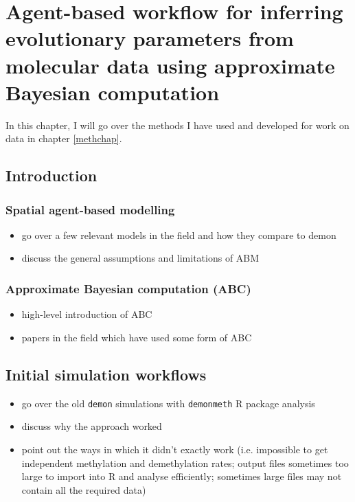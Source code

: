\chapter{Agent-based workflow for inferring evolutionary parameters from molecular data using approximate Bayesian computation}\label{demonchap}
In this chapter, I will go over the methods I have used and developed for work on data in chapter \ref{methchap}.

\section{Introduction}
\subsection{Spatial agent-based modelling}
\begin{itemize}
    \item go over a few relevant models in the field and how they compare to demon
    \item discuss the general assumptions and limitations of ABM
\end{itemize}


\subsection{Approximate Bayesian computation (ABC)}
\begin{itemize}
    \item high-level introduction of ABC
    \item papers in the field which have used some form of ABC
\end{itemize}

\section{Initial simulation workflows}
\begin{itemize}
    \item go over the old \texttt{demon} simulations with \texttt{demonmeth} R package analysis
    \item discuss why the approach worked
    \item point out the ways in which it didn't exactly work (i.e. impossible to get independent methylation and demethylation rates; output files sometimes too large to import into R and analyse efficiently; sometimes large files may not contain all the required data)
\end{itemize}


